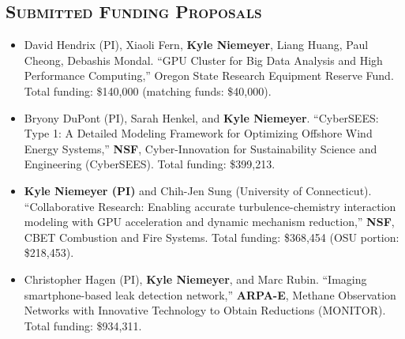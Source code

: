 \documentclass[margin,line,11pt]{res}
\begin{document}
\begin{resume}
%

\section{\textsc{Submitted Funding Proposals}}

\begin{itemize}[leftmargin=*]

\item David Hendrix (PI), Xiaoli Fern, \textbf{Kyle Niemeyer}, Liang Huang, Paul Cheong, Debashis Mondal. ``GPU Cluster for Big Data Analysis and High Performance Computing,'' Oregon State Research Equipment Reserve Fund. Total funding: \$140,000 (matching funds: \$40,000).

\item Bryony DuPont (PI), Sarah Henkel, and \textbf{Kyle Niemeyer}. ``CyberSEES: Type 1: A Detailed Modeling Framework for Optimizing Offshore Wind Energy Systems,'' \textbf{NSF}, Cyber-Innovation for Sustainability Science and Engineering (CyberSEES). Total funding: \$399,213.

\item \textbf{Kyle Niemeyer (PI)} and Chih-Jen Sung (University of Connecticut). ``Collaborative Research: Enabling accurate turbulence-chemistry interaction modeling with GPU acceleration and dynamic mechanism reduction,'' \textbf{NSF}, CBET Combustion and Fire Systems. Total funding: \$368,454 (OSU portion: \$218,453).

\item Christopher Hagen (PI), \textbf{Kyle Niemeyer}, and Marc Rubin. ``Imaging smartphone-based leak detection network,'' \textbf{ARPA-E}, Methane Observation Networks with Innovative Technology to Obtain Reductions (MONITOR). Total funding: \$934,311.


\end{itemize}
\end{resume}
\end{document}
